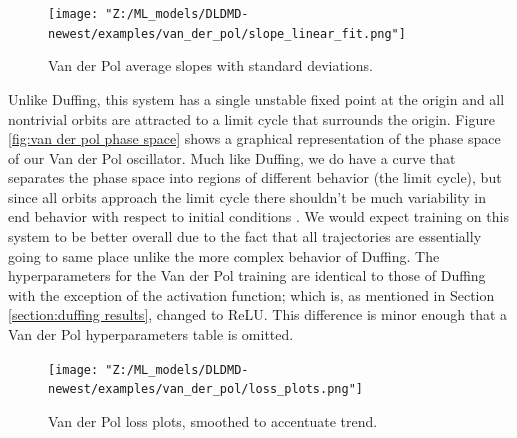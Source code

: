 \begin{figure}[ht]
    \centering
    \begin{minipage}{\textwidth}
        \texttt{[image: "Z:/ML\_models/DLDMD-newest/examples/van\_der\_pol/slope\_linear\_fit.png"]} 
    \end{minipage}
    \caption{Van der Pol average slopes with standard deviations.}
    \label{fig:van der pol average slopes}
\end{figure}
Unlike Duffing, this system has a single unstable fixed point
at the origin and all nontrivial orbits are attracted to a limit cycle that surrounds the origin. 
Figure \ref{fig:van der pol phase space} shows a graphical representation of the phase space of our 
Van der Pol oscillator. Much like Duffing, we do have a curve that separates the phase space into 
regions of different behavior (the limit cycle), but since all orbits approach the limit cycle there
shouldn't be much variability in end behavior with respect to initial conditions \cite{strogatz:2000}. 
We would expect training on this system 
to be better overall due to the fact that all trajectories are essentially going to same place unlike
the more complex behavior of Duffing. The hyperparameters for the Van der Pol
training are identical to those of Duffing with the exception of the activation function; which is, 
as mentioned in Section \ref{section:duffing results}, changed to ReLU. This difference 
is minor enough that a Van der Pol hyperparameters table is omitted.

\begin{figure}[ht]
    \centering
    \begin{minipage}{\textwidth}
        \texttt{[image: "Z:/ML\_models/DLDMD-newest/examples/van\_der\_pol/loss\_plots.png"]} 
    \end{minipage}
    \caption{Van der Pol loss plots, smoothed to accentuate trend.}
    \label{fig:van der pol losses}
\end{figure}

